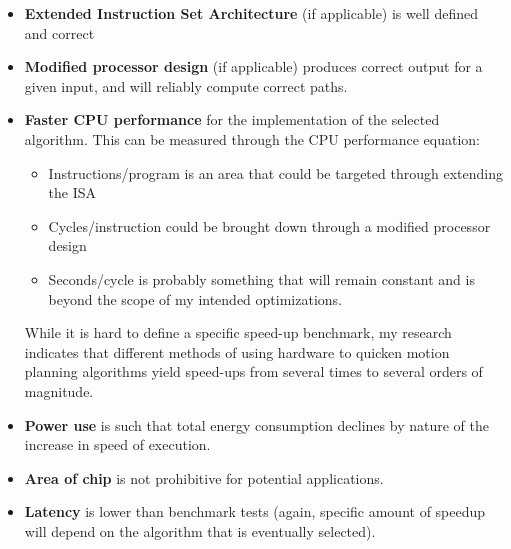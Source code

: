 \documentclass[11pt, oneside]{article}   	%
\begin{document}
\begin{itemize}
    \item \textbf{Extended Instruction Set Architecture} (if applicable) is well defined and correct

    \item \textbf{Modified processor design} (if applicable) produces correct output for a given input, and will reliably compute correct paths.


    \item \textbf{Faster CPU performance} for the implementation of the selected algorithm. This can be measured through the CPU performance equation:
        \begin{itemize}
        \item Instructions/program is an area that could be targeted through extending the ISA
        \item Cycles/instruction could be brought down through a modified processor design
        \item Seconds/cycle is probably something that will remain constant and is beyond the scope of my intended optimizations.
        \end{itemize}
        While it is hard to define a specific speed-up benchmark, my research indicates that different methods of using hardware to quicken motion planning algorithms yield speed-ups from several times to several orders of magnitude.

    \item \textbf{Power use} is such that total energy consumption declines by nature of the increase in speed of execution.

    \item \textbf{Area of chip} is not prohibitive for potential applications.

    \item \textbf{Latency} is lower than benchmark tests (again, specific amount of speedup will depend on the algorithm that is eventually selected).

\end{itemize}
\end{document}
